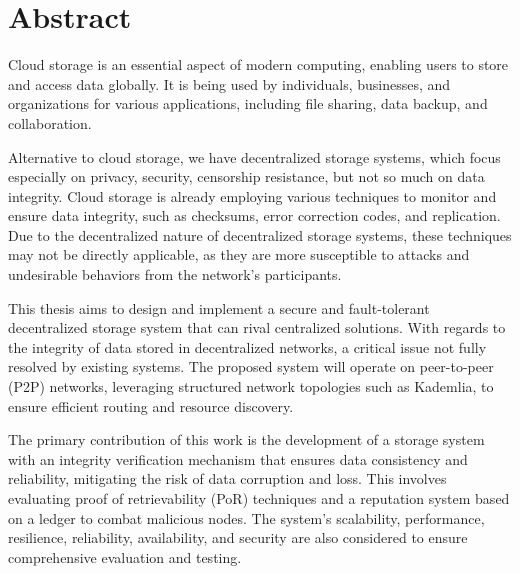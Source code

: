 \begingroup
\let\clearpage\relax
\let\cleardoublepage\relax
\let\cleardoublepage\relax

\chapter*{Abstract}

Cloud storage is an essential aspect of modern computing,
enabling users to store and access data globally.
It is being used by individuals, businesses, and organizations for various applications,
including file sharing, data backup, and collaboration.

Alternative to cloud storage, we have decentralized storage systems,
which focus especially on privacy, security, censorship resistance, but not so much on data integrity.
Cloud storage is already employing various techniques to monitor and ensure data integrity,
such as checksums, error correction codes, and replication.
Due to the decentralized nature of decentralized storage systems,
these techniques may not be directly applicable,
as they are more susceptible to attacks and undesirable behaviors from the network's participants.

This thesis aims to design and implement a secure and fault-tolerant
decentralized storage system that can rival centralized solutions.
With regards to the integrity of data stored in decentralized networks,
a critical issue not fully resolved by existing systems.
The proposed system will operate on peer-to-peer (P2P) networks,
leveraging structured network topologies such as Kademlia,
to ensure efficient routing and resource discovery.

The primary contribution of this work is the development of a storage system with
an integrity verification mechanism that ensures data consistency and reliability,
mitigating the risk of data corruption and loss.
This involves evaluating proof of retrievability (PoR) techniques and a reputation system based on a ledger to combat malicious nodes.
The system's scalability, performance, resilience, reliability, availability,
and security are also considered to ensure comprehensive evaluation and testing.

\vfill
\endgroup			
\vfill

